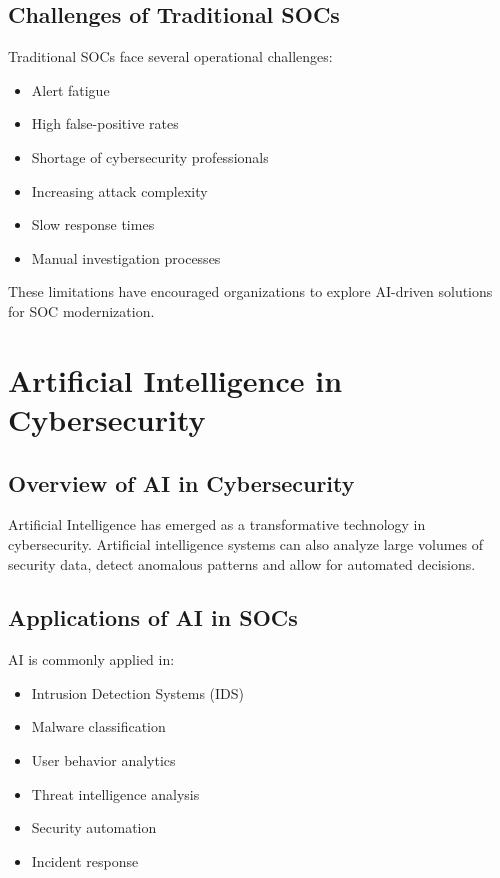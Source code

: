 \documentclass[12pt,a4paper]{report}
\begin{document}
\subsection{Challenges of Traditional SOCs}
Traditional SOCs face several operational challenges:
\begin{itemize}
    \item Alert fatigue
    \item High false-positive rates
    \item Shortage of cybersecurity professionals
    \item Increasing attack complexity
    \item Slow response times
    \item Manual investigation processes
\end{itemize}

These limitations have encouraged organizations to explore AI-driven solutions for SOC modernization.

\section{Artificial Intelligence in Cybersecurity}
\label{sec:ai_cyber}

\subsection{Overview of AI in Cybersecurity}
Artificial Intelligence has emerged as a transformative technology in cybersecurity. Artificial intelligence systems can also analyze large volumes of security data, detect anomalous patterns and allow for automated decisions.

\subsection{Applications of AI in SOCs}
AI is commonly applied in:
\begin{itemize}
    \item Intrusion Detection Systems (IDS)
    \item Malware classification
    \item User behavior analytics
    \item Threat intelligence analysis
    \item Security automation
    \item Incident response
\end{itemize}
\end{document}
